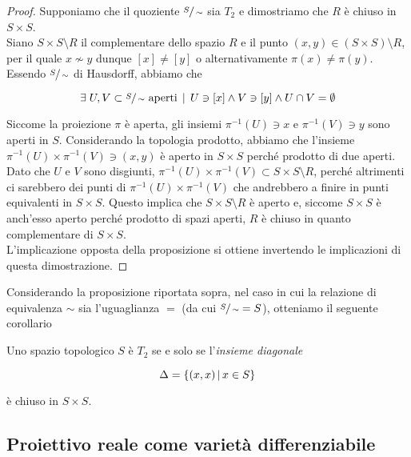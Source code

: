 \begin{proof}
	Supponiamo che il quoziente $ \sfrac{S}{\sim} $ sia $ T_{2} $ e dimostriamo che $ R $ è chiuso in $ S \times S $. \\
	Siano $ S \times S \setminus R $ il complementare dello spazio $ R $ e il punto $ (x,y) \in (S \times S) \setminus R $, per il quale $ x \nsim y $ dunque $ [x] \neq [y] $ o alternativamente $ \pi(x) \neq \pi(y) $. Essendo $ \sfrac{S}{\sim} $ di Hausdorff, abbiamo che
	
	\begin{equation}
		\exists \; U, V \subset \sfrac{S}{\sim} \text{ aperti} \, \mid \, U \ni [x] \wedge V \ni [y] \wedge U \cap V = \emptyset
	\end{equation}
	
	Siccome la proiezione $ \pi $ è aperta, gli insiemi $ \pi^{-1}(U) \ni x $ e $ \pi^{-1}(V) \ni y $ sono aperti in $ S $. Considerando la topologia prodotto, abbiamo che l'insieme $ \pi^{-1}(U) \times \pi^{-1}(V) \ni (x,y) $ è aperto in $ S \times S $ perché prodotto di due aperti. Dato che $ U $ e $ V $ sono disgiunti, $ \pi^{-1}(U) \times \pi^{-1}(V) \subset S \times S \setminus R $, perché altrimenti ci sarebbero dei punti di $ \pi^{-1}(U) \times \pi^{-1}(V) $ che andrebbero a finire in punti equivalenti in $ S \times S $. Questo implica che $ S \times S \setminus R $ è aperto e, siccome $ S \times S $ è anch'esso aperto perché prodotto di spazi aperti, $ R $ è chiuso in quanto complementare di $ S \times S $. \\
	L'implicazione opposta della proposizione si ottiene invertendo le implicazioni di questa dimostrazione.
\end{proof}

Considerando la proposizione riportata sopra, nel caso in cui la relazione di equivalenza $ \sim $ sia l'uguaglianza $ = $ (da cui $ \sfrac{S}{\sim} = S $), otteniamo il seguente corollario

\begin{corollary}
	Uno spazio topologico $ S $ è $ T_{2} $ se e solo se l'\textit{insieme diagonale}
	
	\begin{equation}
		\Delta = \left\{ (x,x) \, \middle| \, x \in S \right\}
	\end{equation}
	
	è chiuso in $ S \times S $.
\end{corollary}

\subsection{Proiettivo reale come varietà differenziabile}

